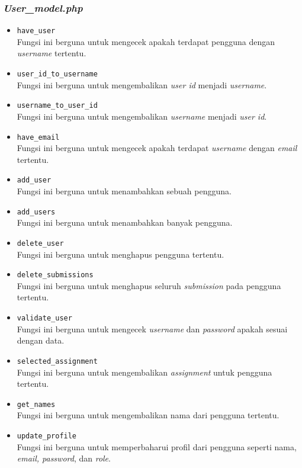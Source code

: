 \subsubsection{\textit{User\_model.php}}
\begin{itemize}
	\item \texttt{have\_user}\\
	Fungsi ini berguna untuk mengecek apakah terdapat pengguna dengan \textit{username} tertentu.
	\item \texttt{user\_id\_to\_username}\\
	Fungsi ini berguna untuk mengembalikan \textit{user id} menjadi \textit{username}.
	\item \texttt{username\_to\_user\_id}\\
	Fungsi ini berguna untuk mengembalikan \textit{username} menjadi \textit{user id}.
	\item \texttt{have\_email}\\
	Fungsi ini berguna untuk mengecek apakah terdapat \textit{username} dengan \textit{email} tertentu.
	\item \texttt{add\_user}\\
	Fungsi ini berguna untuk menambahkan sebuah pengguna.
	\item \texttt{add\_users}\\
	Fungsi ini berguna untuk menambahkan banyak pengguna.
	\item \texttt{delete\_user}\\
	Fungsi ini berguna untuk menghapus pengguna tertentu.
	\item \texttt{delete\_submissions}\\
	Fungsi ini berguna untuk menghapus seluruh \textit{submission} pada pengguna tertentu.
	\item \texttt{validate\_user}\\
	Fungsi ini berguna untuk mengecek \textit{username} dan \textit{password} apakah sesuai dengan data.
	\item \texttt{selected\_assignment}\\
	Fungsi ini berguna untuk mengembalikan \textit{assignment} untuk pengguna tertentu.
	\item \texttt{get\_names}\\
	Fungsi ini berguna untuk mengembalikan nama dari pengguna tertentu.
	\item \texttt{update\_profile}\\
	Fungsi ini berguna untuk memperbaharui profil dari pengguna seperti nama, \textit{email, password}, dan \textit{role}.

\end{itemize}
